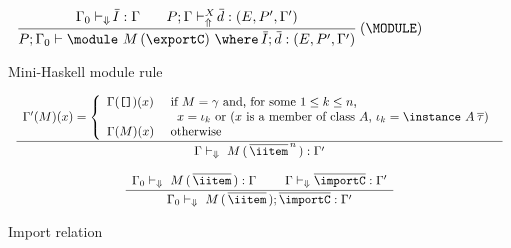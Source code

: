 \begin{figure}
\[ \begin{array}{cc}
	\displaystyle\frac
	 {\begin{array}{ll}
           \Gamma_0 \vdash_{\Downarrow} \overline{\!I} : \Gamma\:\: & \:\:P;\Gamma \vdash_{\Uparrow}^X \overline{\!d} : (E,P',\Gamma') 
          \end{array}}
	 {P;\Gamma_0 \vdash \module\ M\, (\exportC)\ \where\ \overline{\!I};\, \overline{\!d} : (E,P',\Gamma')} \:(\MODULE)
\end{array} \]
\caption{Mini-Haskell module rule} 
\label{fig:mini-haskell-module-rule}
\end{figure}

\begin{figure}
\[ \begin{array}{cc}
	\displaystyle\frac
	 {\begin{array}{ll}
            \Gamma'(M)(x) = \left\{ \begin{array}{ll}
              \Gamma(\texttt{[]})(x) & \text{ if } M = \gamma \text{ and, for some $1 \leq k \leq n$, }\\
                                     & \hspace*{.3cm} 
                                         x = \iota_k \text{ or 
                                         ($x$ is a member of class $A$, } \iota_k = \instance\ A\: \overline{\tau})\\
               \Gamma(M)(x)          & \text{ otherwise}
             \end{array}\right.
          \end{array}}
	 {\Gamma \vdash_{\Downarrow} \ M\, (\,\overline{\iitem}^{\,n}\,) : \Gamma'} \\ \\

	\displaystyle\frac
	 {\begin{array}{ll}
	   \Gamma_0 \vdash_{\Downarrow} \ M\, (\,\overline{\iitem}\,) : \Gamma \:\:\: & \:\:\: 
           \Gamma \vdash_{\Downarrow} \overline{\importC} : \Gamma'
          \end{array}}
	 {\Gamma_0 \vdash_{\Downarrow} \ M\, (\,\overline{\iitem}\,); \overline{\importC} : \Gamma'} 
\end{array} \]
\caption{Import relation}
\label{fig:import-relation}
\end{figure}

